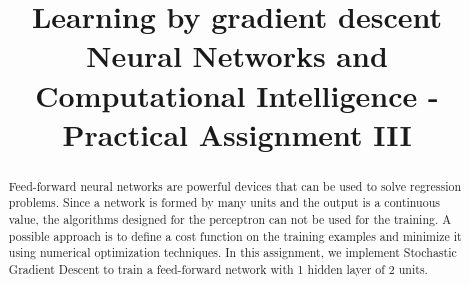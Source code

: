 \documentclass[conference]{IEEEtran}
\begin{document}
\title{
    Learning by gradient descent\\
    \large Neural Networks and Computational Intelligence - Practical Assignment III
}

\author{
    \and
}

\maketitle

\begin{abstract}
    Feed-forward neural networks are powerful devices that can be used to solve regression problems.
    Since a network is formed by many units and the output is a continuous value, the algorithms designed for the perceptron can not be used for the training.
    A possible approach is to define a cost function on the training examples and minimize it using numerical optimization techniques.
    In this assignment, we implement Stochastic Gradient Descent to train a feed-forward network with 1 hidden layer of 2 units.
\end{abstract}

\acresetall










\end{document}
